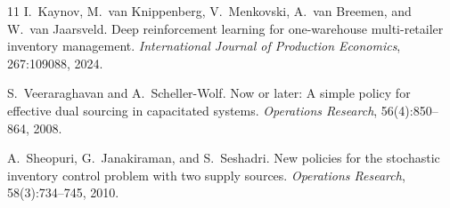 \documentclass[11pt]{article}
\begin{document}
\begin{thebibliography}{11}
I.~Kaynov, M.~van Knippenberg, V.~Menkovski, A.~van Breemen, and W.~van Jaarsveld.
Deep reinforcement learning for one-warehouse multi-retailer inventory management.
\emph{International Journal of Production Economics}, 267:109088, 2024.

S.~Veeraraghavan and A.~Scheller-Wolf.
Now or later: A simple policy for effective dual sourcing in capacitated systems.
\emph{Operations Research}, 56(4):850--864, 2008.

A.~Sheopuri, G.~Janakiraman, and S.~Seshadri.
New policies for the stochastic inventory control problem with two supply sources.
\emph{Operations Research}, 58(3):734--745, 2010.

\end{thebibliography}
\end{document}
